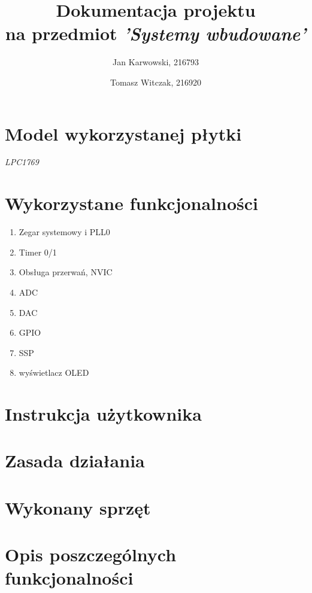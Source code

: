 ﻿\documentclass{article}
\author{
    Jan Karwowski, 216793
        \and
    Tomasz Witczak, 216920
}
\title{\textbf{Dokumentacja projektu}\\na przedmiot \textit{'Systemy wbudowane'}}
\begin{document}
\maketitle
\newpage

\section{Model wykorzystanej płytki}
    \textit{LPC1769}

\section{Wykorzystane funkcjonalności}
\begin{enumerate}
    \item Zegar systemowy i PLL0
    \item Timer 0/1
    \item Obsługa przerwań, NVIC
    \item ADC
    \item DAC
    \item GPIO
    \item SSP
    \item wyświetlacz OLED
\end{enumerate}

\section{Instrukcja użytkownika}
\label{instrukcja_uzytkownika}


\section{Zasada działania}
\label{zasada_dzialania}


\section{Wykonany sprzęt}
\label{wykonany_sprzet}


\section{Opis poszczególnych funkcjonalności}








\end{document}
